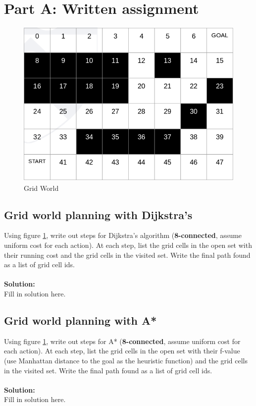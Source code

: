 \documentclass[letta4 paper]{article}
\numberwithin{equation}{section}
\newcommand{\0}{\mathbf{0}}
\begin{document}
	\section{Part A: Written assignment}
	\begin{figure}[!hb]
		\begin{center}
			\includegraphics[scale=0.4]{grid_world.png}
		\end{center}
		\caption{Grid World}
		\label{fig:gridworld}
	\end{figure}
	\subsection{Grid world planning with Dijkstra's}
	Using figure \ref{fig:gridworld}, write out steps for Dijkstra's algorithm (\textbf{8-connected}, assume uniform cost for each action). At each step, list the grid cells in the open set with their running cost and the grid cells in the visited set. Write the final path found as a list of grid cell ids.\\
	\\
	\textbf{Solution:}\\
	
	Fill in solution here.
	
	\newpage
	
	\subsection{Grid world planning with A*}
	Using figure \ref{fig:gridworld}, write out steps for A* (\textbf{8-connected}, assume uniform cost for each action). At each step, list the grid cells in the open set with their f-value (use Manhattan distance to the goal as the heuristic function) and the grid cells in the visited set. Write the final path found as a list of grid cell ids.\\
	\\
	\textbf{Solution:}\\
	
	Fill in solution here.
	
	
			
\end{document}
